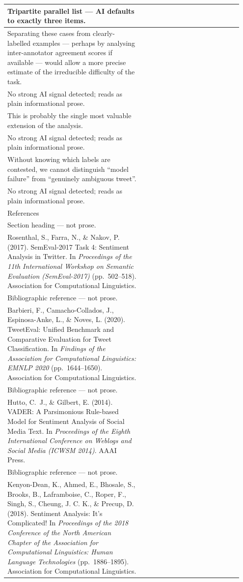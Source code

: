 \documentclass[11pt]{article}
\begin{document}
\begin{longtable}{|p{0.55\linewidth}|p{0.40\linewidth}|}
\hline
Tripartite parallel list --- AI defaults to exactly three items. & \\
\hline
Separating these cases from clearly-labelled examples --- perhaps by analysing inter-annotator agreement scores if available --- would allow a more precise estimate of the irreducible difficulty of the task. & \\[2pt]
\hline
No strong AI signal detected; reads as plain informational prose. & \\
\hline
This is probably the single most valuable extension of the analysis. & \\[2pt]
\hline
No strong AI signal detected; reads as plain informational prose. & \\
\hline
Without knowing which labels are contested, we cannot distinguish ``model failure'' from ``genuinely ambiguous tweet''. & \\[2pt]
\hline
No strong AI signal detected; reads as plain informational prose. & \\
\hline
References & \\[2pt]
\hline
Section heading --- not prose. & \\
\hline
Rosenthal, S., Farra, N., \& Nakov, P. (2017). SemEval-2017 Task 4: Sentiment Analysis in Twitter. In \textit{Proceedings of the 11th International Workshop on Semantic Evaluation (SemEval-2017)} (pp.\ 502--518). Association for Computational Linguistics. & \\[2pt]
\hline
Bibliographic reference --- not prose. & \\
\hline
Barbieri, F., Camacho-Collados, J., Espinosa-Anke, L., \& Noves, L. (2020). TweetEval: Unified Benchmark and Comparative Evaluation for Tweet Classification. In \textit{Findings of the Association for Computational Linguistics: EMNLP 2020} (pp.\ 1644--1650). Association for Computational Linguistics. & \\[2pt]
\hline
Bibliographic reference --- not prose. & \\
\hline
Hutto, C.~J., \& Gilbert, E. (2014). VADER: A Parsimonious Rule-based Model for Sentiment Analysis of Social Media Text. In \textit{Proceedings of the Eighth International Conference on Weblogs and Social Media (ICWSM 2014)}. AAAI Press. & \\[2pt]
\hline
Bibliographic reference --- not prose. & \\
\hline
Kenyon-Dean, K., Ahmed, E., Bhosale, S., Brooks, B., Laframboise, C., Roper, F., Singh, S., Cheung, J. C. K., \& Precup, D. (2018). Sentiment Analysis: It's Complicated! In \textit{Proceedings of the 2018 Conference of the North American Chapter of the Association for Computational Linguistics: Human Language Technologies} (pp.\ 1886--1895). Association for Computational Linguistics. & \\[2pt]

\end{longtable}
\end{document}
